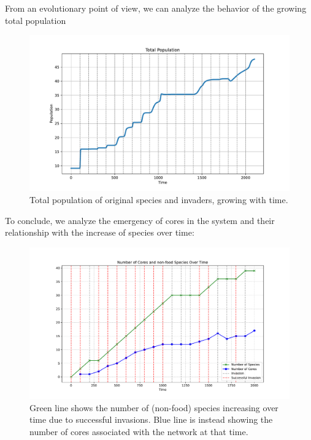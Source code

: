 \documentclass{article}
\begin{document}
From an evolutionary point of view, we can analyze the behavior of the growing total population

\begin{figure}[H]
	\centering
	\includegraphics[width=0.6\linewidth]{Invasions_total_auto.pdf}
	\caption{\small{Total population of original species and invaders, growing with time.}}
	\label{Fig. 17}
\end{figure}

To conclude, we analyze the emergency of cores in the system and their relationship with the increase of species over time:

\begin{figure}[H]
	\centering
	\includegraphics[width=0.6\linewidth]{Cores_species_auto.pdf}
	\caption{\small{Green line shows the number of (non-food) species increasing over time due to successful invasions. Blue line is instead showing the number of cores associated with the network at that time. }}
	\label{Fig. 18}
\end{figure}




\end{document}

